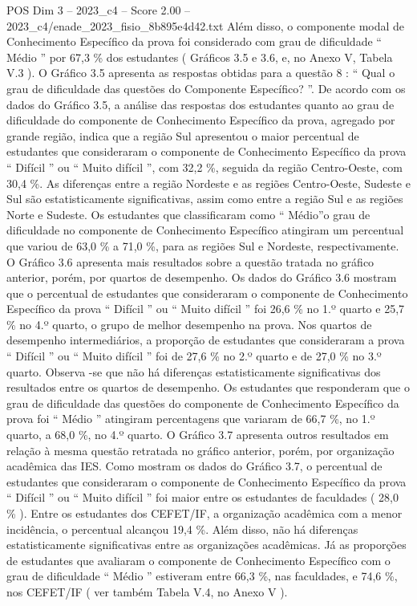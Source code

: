 \begin{textsample}{POS Dim 3 – 2023\_c4 – Score 2.00 – 2023\_c4/enade\_2023\_fisio\_8b895e4d42.txt}
Além disso, o componente modal de Conhecimento Específico da prova foi considerado com grau de dificuldade “ Médio ” por 67,3 \% dos estudantes ( Gráficos 3.5 e 3.6, e, no Anexo V, Tabela V.3 ).
O Gráfico 3.5 apresenta as respostas obtidas para a questão 8 : “ Qual o grau de dificuldade das questões do Componente Específico? ”.
De acordo com os dados do Gráfico 3.5, a análise das respostas dos estudantes quanto ao grau de dificuldade do componente de Conhecimento Específico da prova, agregado por grande região, indica que a região Sul apresentou o maior percentual de estudantes que consideraram o componente de Conhecimento Específico da prova “ Difícil ” ou “ Muito difícil ”, com 32,2 \%, seguida da região Centro-Oeste, com 30,4 \%.
As diferenças entre a região Nordeste e as regiões Centro-Oeste, Sudeste e Sul são estatisticamente significativas, assim como entre a região Sul e as regiões Norte e Sudeste.
Os estudantes que classificaram como “ Médio”o grau de dificuldade no componente de Conhecimento Específico atingiram um percentual que variou de 63,0 \% a 71,0 \%, para as regiões Sul e Nordeste, respectivamente.
O Gráfico 3.6 apresenta mais resultados sobre a questão tratada no gráfico anterior, porém, por quartos de desempenho.
Os dados do Gráfico 3.6 mostram que o percentual de estudantes que consideraram o componente de Conhecimento Específico da prova “ Difícil ” ou “ Muito difícil ” foi 26,6 \% no 1.º quarto e 25,7 \% no 4.º quarto, o grupo de melhor desempenho na prova.
Nos quartos de desempenho intermediários, a proporção de estudantes que consideraram a prova “ Difícil ” ou “ Muito difícil ” foi de 27,6 \% no 2.º quarto e de 27,0 \% no 3.º quarto.
Observa -se que não há diferenças estatisticamente significativas dos resultados entre os quartos de desempenho.
Os estudantes que responderam que o grau de dificuldade das questões do componente de Conhecimento Específico da prova foi “ Médio ” atingiram percentagens que variaram de 66,7 \%, no 1.º quarto, a 68,0 \%, no 4.º quarto.
O Gráfico 3.7 apresenta outros resultados em relação à mesma questão retratada no gráfico anterior, porém, por organização acadêmica das IES.
Como mostram os dados do Gráfico 3.7, o percentual de estudantes que consideraram o componente de Conhecimento Específico da prova “ Difícil ” ou “ Muito difícil ” foi maior entre os estudantes de faculdades ( 28,0 \% ).
Entre os estudantes dos CEFET/IF, a organização acadêmica com a menor incidência, o percentual alcançou 19,4 \%.
Além disso, não há diferenças estatisticamente significativas entre as organizações acadêmicas.
Já as proporções de estudantes que avaliaram o componente de Conhecimento Específico com o grau de dificuldade “ Médio ” estiveram entre 66,3 \%, nas faculdades, e 74,6 \%, nos CEFET/IF ( ver também Tabela V.4, no Anexo V ).

\end{textsample}
